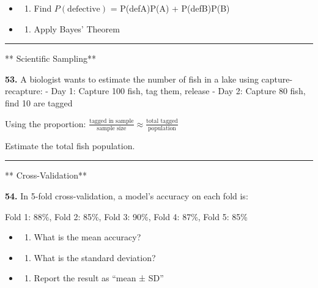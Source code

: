 \documentclass[
  11pt,
]{article}
\providecommand{\tightlist}{%
  \setlength{\itemsep}{0pt}\setlength{\parskip}{0pt}}
\begin{document}
\begin{itemize}
\item
  \begin{enumerate}
  \def\labelenumi{(\alph{enumi})}
  \tightlist
  \item
    Find \(P(\text{defective})\) = P(def\textbar A)P(A) +
    P(def\textbar B)P(B)
  \end{enumerate}
\item
  \begin{enumerate}
  \def\labelenumi{(\alph{enumi})}
  \setcounter{enumi}{1}
  \tightlist
  \item
    Apply Bayes' Theorem
  \end{enumerate}
\end{itemize}

\begin{center}\rule{0.5\linewidth}{0.5pt}\end{center}

** Scientific Sampling**

\textbf{53.} A biologist wants to estimate the number of fish in a lake
using capture-recapture: - Day 1: Capture 100 fish, tag them, release -
Day 2: Capture 80 fish, find 10 are tagged

Using the proportion:
\(\frac{\text{tagged in sample}}{\text{sample size}} \approx \frac{\text{total tagged}}{\text{population}}\)

Estimate the total fish population.

\begin{center}\rule{0.5\linewidth}{0.5pt}\end{center}

** Cross-Validation**

\textbf{54.} In 5-fold cross-validation, a model's accuracy on each fold
is:

Fold 1: 88\%, Fold 2: 85\%, Fold 3: 90\%, Fold 4: 87\%, Fold 5: 85\%

\begin{itemize}
\item
  \begin{enumerate}
  \def\labelenumi{(\alph{enumi})}
  \tightlist
  \item
    What is the mean accuracy?
  \end{enumerate}
\item
  \begin{enumerate}
  \def\labelenumi{(\alph{enumi})}
  \setcounter{enumi}{1}
  \tightlist
  \item
    What is the standard deviation?
  \end{enumerate}
\item
  \begin{enumerate}
  \def\labelenumi{(\alph{enumi})}
  \setcounter{enumi}{2}
  \tightlist
  \item
    Report the result as ``mean ± SD''
  \end{enumerate}
\end{itemize}
\end{document}
